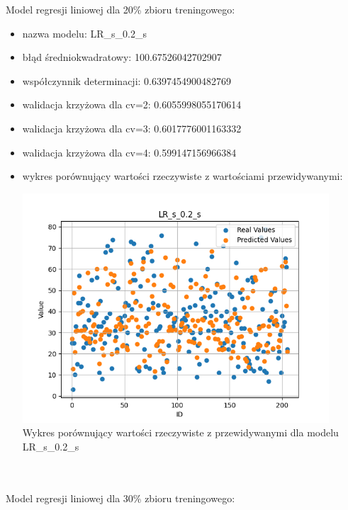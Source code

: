 \documentclass[11pt, a4paper, notitlepage]{report}
\begin{document}
Model regresji liniowej dla 20\% zbioru treningowego:
\begin{itemize}
	\item nazwa modelu: LR\_s\_0.2\_s
	\item błąd średniokwadratowy: 100.67526042702907
	\item współczynnik determinacji: 0.6397454900482769
	\item walidacja krzyżowa dla cv=2: 0.6055998055170614
	\item walidacja krzyżowa dla cv=3: 0.6017776001163332
	\item walidacja krzyżowa dla cv=4: 0.599147156966384
	\item wykres porównujący wartości rzeczywiste z wartościami przewidywanymi: \begin{center} \small
		\includegraphics[width=0.9\textwidth]{graphics/plots/LR_s_0.2_s.png} \\
		\caption{Wykres porównujący wartości rzeczywiste z przewidywanymi dla modelu LR\_s\_0.2\_s}
	\end{center}
	\end{itemize}
\\ \\
Model regresji liniowej dla 30\% zbioru treningowego:
\end{document}

